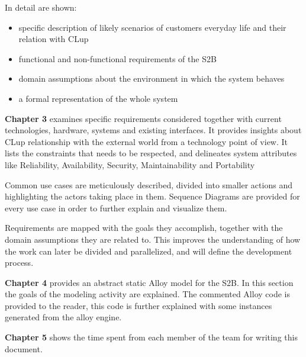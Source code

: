 In detail are shown:
\begin{itemize}
      \item specific description of likely scenarios of customers everyday life and their relation with CLup
      \item functional and non-functional requirements of the S2B
      \item domain assumptions about the environment in which the system behaves
      \item a formal representation of the whole system
\end{itemize}

\textbf{Chapter 3} examines specific requirements considered together with current technologies, hardware, systems and existing interfaces. It provides insights about CLup relationship with the external world from a technology point of view. It lists the constraints that needs to be respected, and delineates system attributes like Reliability, Availability, Security, Maintainability and Portability

Common use cases are meticulously described, divided into smaller actions and highlighting the actors taking place in them. Sequence Diagrams are provided for every use case in order to further explain and visualize them.

Requirements are mapped with the goals they accomplish, together with the domain assumptions they are related to. This improves the understanding of how the work can later be divided and parallelized, and will define the development process.


\textbf{Chapter 4} provides an abstract static Alloy model for the S2B. In this section the goals of the modeling activity are explained. The commented Alloy code is provided to the reader, this code is further explained with some instances generated from the alloy engine.

\textbf{Chapter 5} shows the time spent from each member of the team for writing this document.